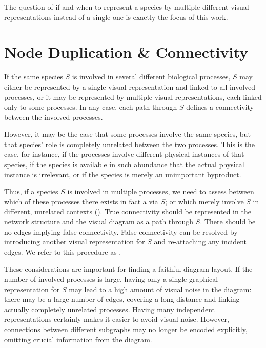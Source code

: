 \documentclass[
	fontsize=10pt, %
	twoside=false, %
	secnumdepth=1, %
  toc=indentunnumbered %
]{kaobook}
\begin{document}
The question of if and when to represent a species by multiple different visual
representations instead of a single one is exactly the focus of this work.


\section{Node Duplication \& Connectivity}

If the same species $S$ is involved in several different biological processes,
$S$ may either be represented by a single visual representation and linked to
all involved processes, or it may be represented by multiple visual
representations, each linked only to some processes.
%
In any case, each path through $S$ defines a connectivity
between the involved processes.

However, it may be the case that some processes involve the same
species, but that species' role is completely unrelated between the two
processes. This is the case, for instance, if the processes involve different
physical instances of that species, if the species is available in such
abundance that the actual physical instance is irrelevant, or if the species is
merely an unimportant byproduct.

Thus, if a species $S$ is involved in multiple processes, we need to assess
between which of these processes there exists in fact a 
via $S$; or which merely involve $S$ in different, unrelated contexts
().
%
True connectivity should be represented in the network structure and the visual
diagram as a path through $S$. There should be no edges implying false
connectivity.
False connectivity can be resolved by introducing another visual representation
for $S$ and re-attaching any incident edges. We refer to this procedure as
.

These considerations are important for finding a faithful diagram layout.
If the number of involved processes is large, having only a single graphical
representation for $S$ may lead to a high amount of visual noise in the diagram: there
may be a large number of edges, covering a long distance and linking actually
completely unrelated processes.
%
Having many independent representations
certainly makes it easier to avoid visual noise. However, connections between
different subgraphs may no longer be encoded explicitly, omitting crucial
information from the diagram.
\end{document}
